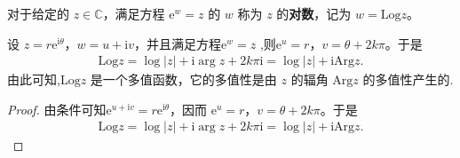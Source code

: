 \documentclass[../../main.tex]{subfiles}
\begin{document}
\begin{definition}
对于给定的 \( z \in \mathbb{C} \)，满足方程 \( \mathrm{e}^w = z \) 的 \( w \) 称为 \( z \) 的\textbf{对数}，记为 \( w = \mathrm{Log} z \)。
\end{definition}

\begin{proposition}
设 \( z = r\mathrm{e}^{\mathrm{i}\theta} \)，\( w = u + \mathrm{i}v \)，并且满足方程\( \mathrm{e}^w = z \) ,则\( \mathrm{e}^u = r \)，\( v = \theta + 2k\pi \)。于是
\begin{align*}
\mathrm{Log} z = \log|z| + \mathrm{i}\arg z + 2k\pi\mathrm{i} = \log|z| + \mathrm{i}\mathrm{Arg} z.
\end{align*}
由此可知,\( \mathrm{Log} z \) 是一个多值函数，它的多值性是由 \( z \) 的辐角 \( \mathrm{Arg} z \) 的多值性产生的.
\end{proposition}
\begin{proof}
由条件可知\( \mathrm{e}^{u + \mathrm{i}v} = r\mathrm{e}^{\mathrm{i}\theta} \)，因而 \( \mathrm{e}^u = r \)，\( v = \theta + 2k\pi \)。于是
\begin{align*}
\mathrm{Log} z = \log|z| + \mathrm{i}\arg z + 2k\pi\mathrm{i} = \log|z| + \mathrm{i}\mathrm{Arg} z.
\end{align*}
\end{proof}
\end{document}
